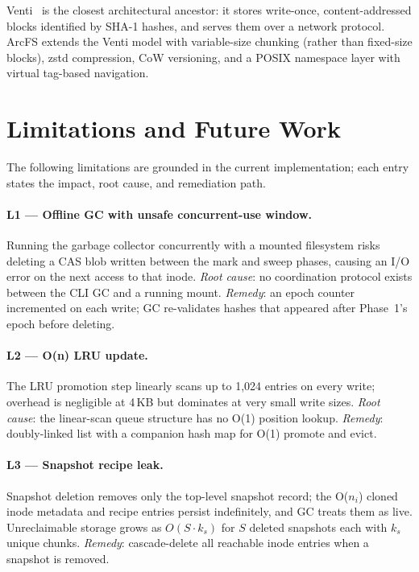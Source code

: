 \documentclass[5p,times]{elsarticle}
\begin{document}
Venti~\cite{quinlan2002venti} is the closest architectural ancestor: it
stores write-once, content-addressed blocks identified by SHA-1 hashes,
and serves them over a network protocol.  ArcFS extends the Venti model
with variable-size chunking (rather than fixed-size blocks), zstd
compression, CoW versioning, and a POSIX namespace layer with virtual
tag-based navigation.

\section{Limitations and Future Work}
\label{sec:limits}

The following limitations are grounded in the current implementation;
each entry states the impact, root cause, and remediation path.

\paragraph{L1 — Offline GC with unsafe concurrent-use window.}
Running the garbage collector concurrently with a mounted filesystem
risks deleting a CAS blob written between the mark and sweep phases,
causing an I/O error on the next access to that inode.  \textit{Root cause}:
no coordination protocol exists between the CLI GC and a running mount.
\textit{Remedy}: an epoch counter incremented on each write; GC
re-validates hashes that appeared after Phase~1's epoch before deleting.

\paragraph{L2 — O(n) LRU update.}
The LRU promotion step linearly scans up to 1,024 entries on every write;
overhead is negligible at 4\,KB but dominates at very small write sizes.
\textit{Root cause}: the linear-scan queue structure has no O(1) position
lookup.  \textit{Remedy}: doubly-linked list with a companion hash map for
O(1) promote and evict.

\paragraph{L3 — Snapshot recipe leak.}
Snapshot deletion removes only the top-level snapshot record; the
O($n_i$) cloned inode metadata and recipe entries persist indefinitely,
and GC treats them as live.  Unreclaimable storage grows as
$O(S \cdot k_s)$ for $S$ deleted snapshots each with $k_s$ unique chunks.
\textit{Remedy}: cascade-delete all reachable inode entries when a
snapshot is removed.
\end{document}

